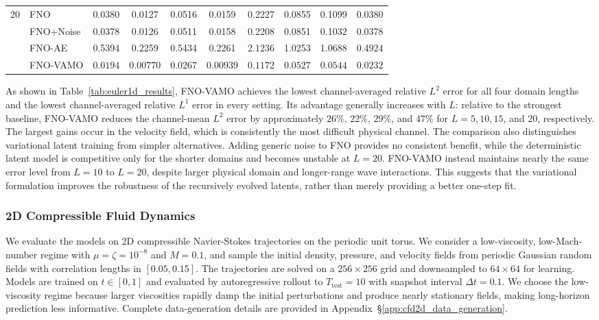 \documentclass[11pt]{article}
\begin{document}
\begin{table}[t]
{\begin{tabular}{llcccccccc}
\midrule
\multirow{4}{*}{$20$}
& FNO       & 0.0380 & 0.0127 & 0.0516 & 0.0159 & 0.2227 & 0.0855 & 0.1099 & 0.0380 \\
& FNO+Noise & 0.0378 & 0.0126 & 0.0511 & 0.0158 & 0.2208 & 0.0851 & 0.1032 & 0.0378 \\
& FNO-AE    & 0.5394 & 0.2259 & 0.5434 & 0.2261 & 2.1236 & 1.0253 & 1.0688 & 0.4924 \\
& FNO-VAMO  & $\mathbf{0.0194}$ & $\mathbf{0.00770}$ & $\mathbf{0.0267}$ & $\mathbf{0.00939}$ & $\mathbf{0.1172}$ & $\mathbf{0.0527}$ & $\mathbf{0.0544}$ & $\mathbf{0.0232}$ \\
\bottomrule
\end{tabular}
}
\end{table}

As shown in Table~\ref{tab:euler1d_results}, FNO-VAMO achieves the lowest channel-averaged relative $L^2$ error for all four domain lengths and the lowest channel-averaged relative $L^1$ error in every setting. Its advantage generally increases with $L$: relative to the strongest baseline, FNO-VAMO reduces the channel-mean $L^2$ error by approximately $26\%$, $22\%$, $29\%$, and $47\%$ for $L=5,10,15$, and $20$, respectively. The largest gains occur in the velocity field, which is consistently the most difficult physical channel. The comparison also distinguishes variational latent training from simpler alternatives. Adding generic noise to FNO provides no consistent benefit, while the deterministic latent model is competitive only for the shorter domains and becomes unstable at $L=20$. FNO-VAMO instead maintains nearly the same error level from $L=10$ to $L=20$, despite larger physical domain and longer-range wave interactions. This suggests that the variational formulation improves the robustness of the recursively evolved latents, rather than merely providing a better one-step fit.


\subsubsection{2D Compressible Fluid Dynamics}
\label{sec:cfd2d_results}

We evaluate the models on 2D compressible Navier-Stokes trajectories on the periodic unit torus. We consider a low-viscosity, low-Mach-number regime with $\mu=\zeta=10^{-8}$ and $M=0.1$, and sample the initial density, pressure, and velocity fields from periodic Gaussian random fields with correlation lengths in $[0.05,0.15]$. The trajectories are solved on a $256\times256$ grid and downsampled to $64\times64$ for learning. Models are trained on $t\in[0,1]$ and evaluated by autoregressive rollout to $T_{\mathrm{test}}=10$ with snapshot interval $\Delta t=0.1$. We choose the low-viscosity regime because larger viscosities rapidly damp the initial perturbations and produce nearly stationary fields, making long-horizon prediction less informative. Complete data-generation details are provided in Appendix~\S\ref{app:cfd2d_data_generation}.
\end{document}
